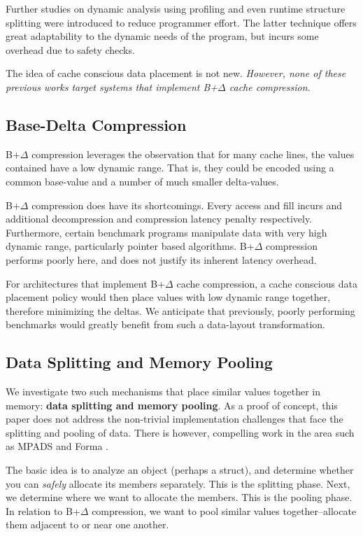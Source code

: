 \documentclass[pageno]{jpaper}
\begin{document}
Further studies on dynamic analysis using profiling \cite{autoPoolAlloc} and even runtime structure splitting \cite{runtimeSplit} were introduced to reduce programmer effort. The latter technique offers great adaptability to the dynamic needs of the program, but incurs some overhead due to safety checks.

The idea of cache conscious data placement is not new. \textit{However, none of these previous works target systems that implement B+$\Delta$ cache compression}.


\subsection{Base-Delta Compression}

B+$\Delta$ compression \cite{baseDeltaImm} leverages the observation that for many cache lines, the values contained have a low dynamic range. That is, they could be encoded using a common base-value and a number of much smaller delta-values.

B+$\Delta$ compression does have its shortcomings. Every access and fill incurs and additional decompression and compression latency penalty respectively. Furthermore, certain benchmark programs manipulate data with very high dynamic range, particularly pointer based algorithms. B+$\Delta$ compression performs poorly here, and does not justify its inherent latency overhead.

For architectures that implement B+$\Delta$ cache compression, a cache conscious data placement policy would then place values with low dynamic range together, therefore minimizing the deltas. We anticipate that previously, poorly performing benchmarks would greatly benefit from such a data-layout transformation.

\subsection{Data Splitting and Memory Pooling}
We investigate two such mechanisms that place similar values together in memory: \textbf{data splitting and memory pooling}. As a proof of concept, this paper does not address the non-trivial implementation challenges that face the splitting and pooling of data. There is however, compelling work in the area such as MPADS \cite{mpads} and Forma \cite{forma}.

The basic idea is to analyze an object (perhaps a struct), and determine whether you can \textit{safely} allocate its members separately. This is the splitting phase. Next, we determine where we want to allocate the members. This is the pooling phase. In relation to B+$\Delta$ compression, we want to pool similar values together--allocate them adjacent to or near one another.
\end{document}
